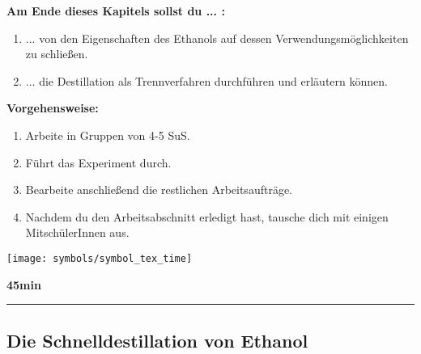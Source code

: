 \documentclass{scrartcl}  %
\begin{document}
			\begin{minipage}{0.7\textwidth}
				\noindent \textbf{Am Ende dieses Kapitels sollst du ... :}
				\begin{enumerate}
					\item ... von den Eigenschaften des Ethanols auf dessen Verwendungsmöglichkeiten zu schließen.
					\item ... die Destillation als Trennverfahren durchführen und erläutern können.
				\end{enumerate}
				\textbf{Vorgehensweise:}
				\begin{enumerate}
					\item Arbeite in Gruppen von 4-5 SuS.
					\item Führt das Experiment durch.
					\item Bearbeite anschließend die restlichen Arbeitsaufträge.
					\item Nachdem du den Arbeitsabschnitt erledigt hast, tausche dich mit einigen MitschülerInnen aus. 
				\end{enumerate}
				
			\end{minipage}
			\hspace{0.1\textwidth}
			\begin{minipage}{0.2\textwidth}
				\begin{tcolorbox}
					[enhanced,
					width=0.9\textwidth,
					colback=white,
					colframe=black,
					fonttitle=\sffamily\bfseries\large, 
					title=Zeit,  %
					attach boxed title to top center={xshift=-0.0mm,yshift=-0.50mm},
					boxed title style={skin=enhancedfirst jigsaw,size=small,arc=1mm,bottom=-1mm,colframe=black,height=0.75cm},
					colbacktitle=black,
					drop lifted shadow]
					\centering
					\texttt{[image: symbols/symbol\_tex\_time]}
					
					\begin{center}
						\textbf{45min}
					\end{center}
				\end{tcolorbox}
			\end{minipage}
			
			\begin{center}
				\noindent\rule{18cm}{0.1pt}
			\end{center}

\newpage

		\subsection{Die Schnelldestillation von Ethanol}
		
\end{document}
